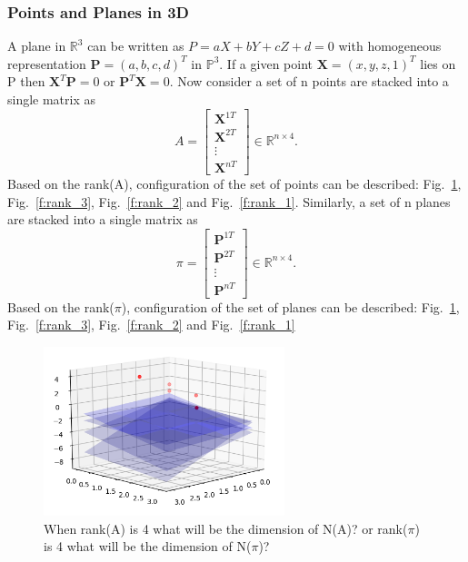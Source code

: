 \documentclass[12pt]{article}%
\begin{document}
\subsubsection{Points and Planes in 3D}
A plane in $\mathbb{R}^3$ can be written as $P = aX+bY+cZ+d = 0$ with homogeneous representation $\mathbf{P} = (a,b,c,d)^T$ in $\mathbb{P}^3$. If a given point $\mathbf{X} = (x,y,z,1)^T$ lies on P then $\mathbf{X}^T\mathbf{P} = 0$ or $\mathbf{P}^T\mathbf{X} = 0$. Now consider a set of n points are stacked into a single matrix as 
    \begin{equation}
        A = \begin{bmatrix}
\mathbf{X}^{1T}\\ 
\mathbf{X}^{2T}\\ 
\vdots \\ 
\mathbf{X}^{nT}
\end{bmatrix} \in \mathbb{R}^{n\times 4}.
    \end{equation} Based on the rank(A), configuration of the set of points can be described: Fig.~\ref{f:rank_4}, Fig.~\ref{f:rank_3}, Fig.~\ref{f:rank_2} and Fig.~\ref{f:rank_1}. Similarly, a set of n planes are stacked into a single matrix as 
    \begin{equation}
        \pi = \begin{bmatrix}
\mathbf{P}^{1T}\\ 
\mathbf{P}^{2T}\\ 
\vdots \\ 
\mathbf{P}^{nT}
\end{bmatrix} \in \mathbb{R}^{n\times 4}.
    \end{equation} Based on the rank($\pi$), configuration of the set of planes can be described: Fig.~\ref{f:rank_4}, Fig.~\ref{f:rank_3}, Fig.~\ref{f:rank_2} and Fig.~\ref{f:rank_1}
    
    \begin{figure}[H]
    \begin{center}
    \includegraphics[width=7cm]{rank_4.png}
    \caption{\label{f:rank_4} When rank(A) is 4 what will be the dimension of N(A)? or rank($\pi$) is 4 what will be the dimension of N($\pi$)?}
    \end{center}
    \end{figure} 
    
\end{document}
